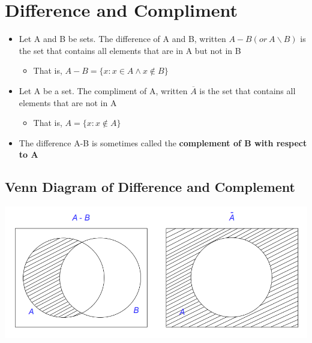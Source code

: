 \documentclass{article}[18pt]
\begin{document}
\section{Difference and Compliment}
\begin{itemize}
	\item Let A and B be sets. The difference of A and B, written $A-B (or  \ A\backslash B)$ is the set that contains all elements that are in A but not in B
	\begin{itemize}
		\item That is, $A - B = \{ x : x \in A \wedge x \notin B \}$
	\end{itemize}
	\item Let A be a set. The compliment of A, written $\overline{A}$ is the set that contains all elements that are not in A
	\begin{itemize}
		\item That is, $A = \{ x : x \notin A \}$
	\end{itemize}
	\item The difference A-B is sometimes called the \textbf{complement of B with respect to A}
\end{itemize}
\subsection{Venn Diagram of Difference and Complement}
\begin{center}
	\includegraphics[scale=0.7]{venn3}
\end{center}
\end{document}
